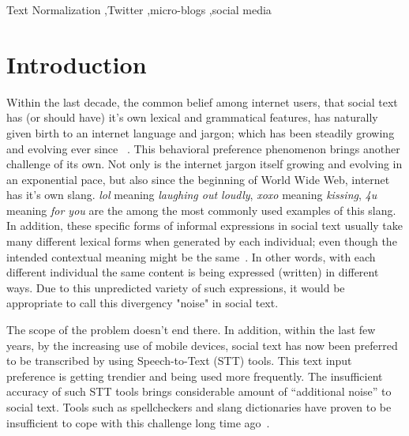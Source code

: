 \documentclass[preprint,review,12pt]{elsarticle}
\begin{document}
\begin{frontmatter}
\begin{abstract}
\end{abstract}

\begin{keyword}
Text Normalization \sep Twitter \sep micro-blogs \sep social media

\end{keyword}

\end{frontmatter}



\section{Introduction}
\label{sec:introduction}

Within the last decade, the common belief among internet users, that social text has (or should have) it's own lexical and grammatical features, has naturally given birth to an internet language and jargon; which has been steadily growing and evolving ever since ~\cite{Choudhury:2007:IMS:1326044.1326048, eisenstein2013bad}. This behavioral preference phenomenon brings another challenge of its own. Not only is the internet jargon itself growing and evolving in an exponential pace, but also since the beginning of World Wide Web, internet has it's own slang. \textit{lol} meaning \textit{laughing out loudly},  \textit{xoxo} meaning \textit{kissing}, \textit{4u} meaning \textit{for you} are the among the most commonly used examples of this slang. In addition, these specific forms of informal expressions in social text usually take many different lexical forms when generated by each individual; even though the intended contextual meaning might be the same~\cite{eisenstein2013bad}. In other words, with each different individual the same content is being expressed (written) in different ways. Due to this unpredicted variety of such expressions, it would be appropriate to call this divergency "noise" in social text.

The scope of the problem doesn't end there. In addition, within the last few years, by the increasing use of mobile devices, social text has now been preferred to be transcribed by using Speech-to-Text (STT) tools. This text input preference is getting trendier and being used more frequently. The insufficient accuracy of such STT tools brings considerable amount of ``additional noise'' to social text. Tools such as spellcheckers and slang dictionaries have proven to be insufficient to cope with this challenge long time ago~\cite{sproat2001normalization}.
\end{document}
